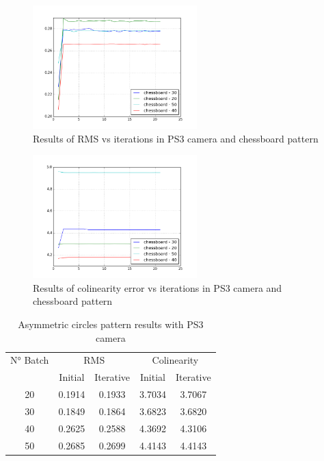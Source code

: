 \documentclass[journal]{IEEEtran}
\begin{document}
\begin{figure}[H]
\centering
\includegraphics[width=2.5in]{_img/report_4/img_results_ps3_chessboard.png}
\caption{Results of RMS vs iterations in PS3 camera and chessboard pattern}
\end{figure}

\begin{figure}[H]
\centering
\includegraphics[width=2.5in]{_img/report_4/img_results_ps3_colinearity_chessboard.png}
\caption{Results of colinearity error vs iterations in PS3 camera and chessboard pattern}
\end{figure}

\begin{table}[h]
\centering
\caption{Asymmetric circles pattern results with PS3 camera}
\begin{tabular}{ |c||c|c|c|c|  }
 \hline
 N° Batch & \multicolumn{2}{c|}{RMS} & \multicolumn{2}{c|}{Colinearity}\\
 \cline{2-5}
 & Initial & Iterative & Initial & Iterative \\
 \hline
 20        & 0.1914 & 0.1933 & 3.7034 & 3.7067 \\
 30        & 0.1849 & 0.1864 & 3.6823 & 3.6820 \\
 40        & 0.2625 & 0.2588 & 4.3692 & 4.3106 \\
 50        & 0.2685 & 0.2699 & 4.4143 & 4.4143 \\
 \hline
\end{tabular}
\\
\end{table}
\end{document}
